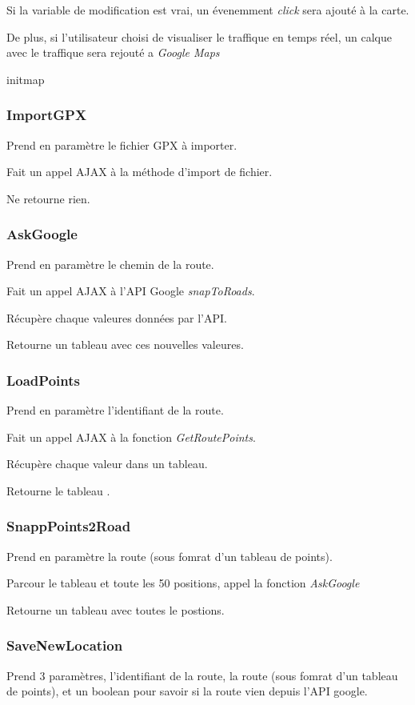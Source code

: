 \documentclass[a4paper]{article}
\newcommand{\gmap}{\emph{Google Maps}}
\newcommand{\diag}[1]{}
\begin{document}
Si la variable de modification est vrai, un évenemment \emph{click} sera ajouté à la carte.

De plus, si l'utilisateur choisi de visualiser le traffique en temps réel, un calque avec le traffique sera rejouté a \gmap


\begin{center}
	\diag{initMap}
	\caption{initmap}
\end{center}

\subsubsection{ImportGPX}
Prend en paramètre le fichier GPX à importer.

Fait un appel AJAX à la méthode d'import de fichier.

Ne retourne rien.

\subsubsection{AskGoogle}
Prend en paramètre le chemin de la route.

Fait un appel AJAX à l'API Google \emph{snapToRoads}.

Récupère chaque valeures données par l'API.

Retourne un tableau avec ces nouvelles valeures.

\subsubsection{LoadPoints}
Prend en paramètre l'identifiant de la route.

Fait un appel AJAX à la fonction \emph{GetRoutePoints}.

Récupère chaque valeur dans un tableau.

Retourne le tableau .

\subsubsection{SnappPoints2Road}
Prend en paramètre la route (sous fomrat d'un tableau de points).

Parcour le tableau et toute les 50 positions, appel la fonction \emph{AskGoogle}

Retourne un tableau avec toutes le postions.

\subsubsection{SaveNewLocation}
Prend 3 paramètres, l'identifiant de la route, la route (sous fomrat d'un tableau de points), et un boolean pour savoir si la route vien depuis l'API google.
\end{document}

